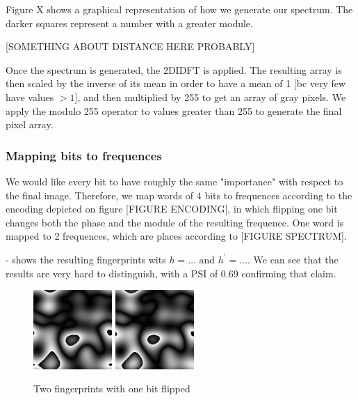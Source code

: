 \documentclass{article}
\begin{document}
Figure X shows a graphical representation of how we generate our spectrum. The darker squares represent a number with a greater module.

[SOMETHING ABOUT DISTANCE HERE PROBABLY]

Once the spectrum is generated, the 2DIDFT is applied. The resulting array is then scaled by the inverse of its mean in order to have a mean of 1 [bc very few have values $> 1$], and then multiplied by 255 to get an array of gray pixels. We apply the modulo 255 operator to values greater than 255 to generate the final pixel array. 

\subsubsection{Mapping bits to frequences}
We would like every bit to have roughly the same "importance" with respect to the final image. Therefore, we map words of 4 bits to frequences according to the encoding depicted on figure [FIGURE ENCODING], in which flipping one bit changes both the phase and the module of the resulting frequence. One word is mapped to 2 frequences, which are places according to [FIGURE SPECTRUM].

- shows the resulting fingerprints wits $h = \dots$ and $h^\prime = \dots$. We can see that the results are very hard to distinguish, with a PSI of 0.69 confirming that claim.

\begin{center}
\begin{figure}
    \centering
    \includegraphics[width=3cm]{figures/Nothing.png}
    \hspace{4pt}
    \includegraphics[width=3cm]{figures/NothingP67Psi0664}
    \caption{Two fingerprints with one bit flipped}
    \label{fig:nothing}
\end{figure}
\end{center}
\end{document}
